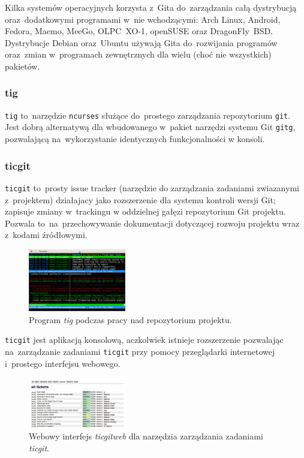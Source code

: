 Kilka systemów operacyjnych korzysta z~Gita do~zarządzania całą dystrybucją oraz~dodatkowymi programami w~nie wchodzącymi: Arch Linux, Android, Fedora, Maemo, MeeGo, OLPC~XO-1, openSUSE oraz DragonFly~BSD. Dystrybucje Debian oraz~Ubuntu używają Gita do~rozwijania programów oraz~zmian w~programach zewnętrznych dla wielu (choć nie wszystkich) pakietów.

\subsubsection{tig}

\texttt{tig} to~narzędzie \texttt{ncurses} służące do~prostego zarządzania repozytorium \texttt{git}. Jest dobrą alternatywą dla wbudowanego w~pakiet narzędzi systemu Git \texttt{gitg}, pozwalającą na~wykorzystanie identycznych funkcjonalności w konsoli.

\subsubsection{ticgit}

\texttt{ticgit}\cite{ticgit} to~prosty issue tracker (narzędzie do zarządzania zadaniami zwiazanymi z~projektem) działajacy jako rozszerzenie dla systemu kontroli wersji Git; zapisuje zmiany w~trackingu w oddzielnej gałęzi repozytorium Git projektu. Pozwala to~na~przechowywanie dokumentacji dotyczącej rozwoju projektu wraz z~kodami źródłowymi.

\begin{figure}
  \begin{center}
    \includegraphics[width=0.38\textwidth]{obrazki/tig.png}
  \end{center}
  \caption{Program \textit{tig} podczas pracy nad repozytorium projektu.}
\end{figure}

\texttt{ticgit} jest aplikacją konsolową, aczkolwiek istnieje rozszerzenie pozwalając na~zarządzanie zadaniami \texttt{ticgit} przy pomocy przeglądarki internetowej i~prostego interfejsu webowego\cite{ticgitweb}.

\begin{figure}
  \begin{center}
    \includegraphics[width=0.38\textwidth]{obrazki/ticgitweb.png}
  \end{center}
  \caption{Webowy interfejs \textit{ticgitweb} dla narzędzia zarządzania zadaniami \textit{ticgit}.}
\end{figure}

